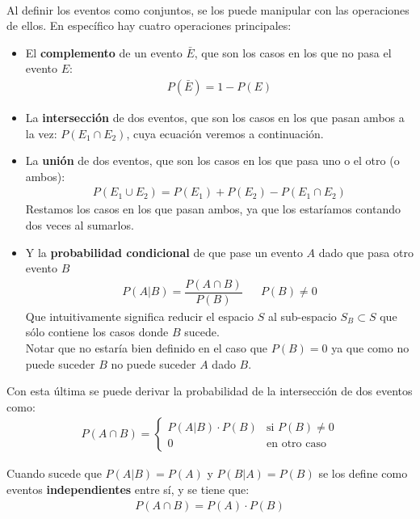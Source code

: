 \documentclass[../main.tex]{subfiles}
\begin{document}
\paragraph{} Al definir los eventos como conjuntos, se los puede manipular con las operaciones de ellos. En específico hay cuatro operaciones principales:
\begin{itemize}
  \item El \textbf{complemento} de un evento \(\bar{E}\), que son los casos en los que no pasa el evento \(E\):
    \begin{gather*}
      P(\bar{E}) = 1 - P(E)
    \end{gather*}
  \item La \textbf{intersección} de dos eventos, que son los casos en los que pasan ambos a la vez: \(P(E_{1} \cap E_{2})\), cuya ecuación veremos a continuación.
  \item La \textbf{unión} de dos eventos, que son los casos en los que pasa uno o el otro (o ambos):
    \begin{gather*}
      P(E_{1} \cup E_{2}) = P(E_{1}) + P(E_{2}) - P(E_{1} \cap E_{2})
    \end{gather*}
    Restamos los casos en los que pasan ambos, ya que los estaríamos contando dos veces al sumarlos.
  \item Y la \textbf{probabilidad condicional} de que pase un evento \(A\) dado que pasa otro evento \(B\)
    \begin{align*}
      P(A | B) = \dfrac{P(A \cap B)}{P(B)} && P(B) \neq 0
    \end{align*}
    Que intuitivamente significa reducir el espacio \(S\) al sub-espacio \(S_{B} \subset S\) que sólo contiene los casos donde \(B\) sucede. \\
    Notar que no estaría bien definido en el caso que \(P(B) = 0\) ya que como no puede suceder \(B\) no puede suceder \(A\) dado \(B\).
\end{itemize}

Con esta última se puede derivar la probabilidad de la intersección de dos eventos como: 
\begin{gather*}
  P(A \cap B) = \begin{cases} P(A | B) \cdot P(B) & \text{si } P(B) \neq 0 \\ 0 & \text{en otro caso} \end{cases}
\end{gather*}

Cuando sucede que \(P(A|B) = P(A)\) y \(P(B|A) = P(B)\) se los define como eventos \textbf{independientes} entre sí, y se tiene que:
\begin{gather*}
  P(A \cap B) = P(A) \cdot P(B)
\end{gather*}
\end{document}
